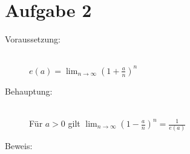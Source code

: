 \documentclass[10pt, a4paper]{article}
\begin{document}

	\newpage

	\section*{Aufgabe 2} %
	\label{sec:aufgabe_2}
	
		\begin{description}
			\item[Voraussetzung:] \hfill \\
				$e(a) = \lim_{n\rightarrow\infty}\left( 1+\frac{a}{n} \right)^n$
			\item[Behauptung:] \hfill \\
				Für $a > 0$ gilt
				$\lim_{n\rightarrow\infty}\left(1-\frac{a}{n}\right)^n = \frac{1}{e(a)}$
			\item[Beweis:]
		\end{description}
		
\end{document}
